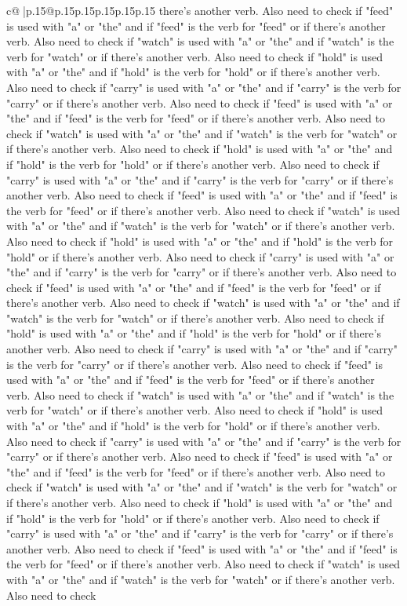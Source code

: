 \documentclass{article}
\begin{document}
{\begin{supertabular}{c@{$\;$}|p{.15\linewidth}@{}p{.15\linewidth}p{.15\linewidth}p{.15\linewidth}p{.15\linewidth}p{.15\linewidth}}
{{{there's another verb. Also need to check if "feed" is used with "a" or "the" and if "feed" is the verb for "feed" or if there's another verb. Also need to check if "watch" is used with "a" or "the" and if "watch" is the verb for "watch" or if there's another verb. Also need to check if "hold" is used with "a" or "the" and if "hold" is the verb for "hold" or if there's another verb. Also need to check if "carry" is used with "a" or "the" and if "carry" is the verb for "carry" or if there's another verb. Also need to check if "feed" is used with "a" or "the" and if "feed" is the verb for "feed" or if there's another verb. Also need to check if "watch" is used with "a" or "the" and if "watch" is the verb for "watch" or if there's another verb. Also need to check if "hold" is used with "a" or "the" and if "hold" is the verb for "hold" or if there's another verb. Also need to check if "carry" is used with "a" or "the" and if "carry" is the verb for "carry" or if there's another verb. Also need to check if "feed" is used with "a" or "the" and if "feed" is the verb for "feed" or if there's another verb. Also need to check if "watch" is used with "a" or "the" and if "watch" is the verb for "watch" or if there's another verb. Also need to check if "hold" is used with "a" or "the" and if "hold" is the verb for "hold" or if there's another verb. Also need to check if "carry" is used with "a" or "the" and if "carry" is the verb for "carry" or if there's another verb. Also need to check if "feed" is used with "a" or "the" and if "feed" is the verb for "feed" or if there's another verb. Also need to check if "watch" is used with "a" or "the" and if "watch" is the verb for "watch" or if there's another verb. Also need to check if "hold" is used with "a" or "the" and if "hold" is the verb for "hold" or if there's another verb. Also need to check if "carry" is used with "a" or "the" and if "carry" is the verb for "carry" or if there's another verb. Also need to check if "feed" is used with "a" or "the" and if "feed" is the verb for "feed" or if there's another verb. Also need to check if "watch" is used with "a" or "the" and if "watch" is the verb for "watch" or if there's another verb. Also need to check if "hold" is used with "a" or "the" and if "hold" is the verb for "hold" or if there's another verb. Also need to check if "carry" is used with "a" or "the" and if "carry" is the verb for "carry" or if there's another verb. Also need to check if "feed" is used with "a" or "the" and if "feed" is the verb for "feed" or if there's another verb. Also need to check if "watch" is used with "a" or "the" and if "watch" is the verb for "watch" or if there's another verb. Also need to check if "hold" is used with "a" or "the" and if "hold" is the verb for "hold" or if there's another verb. Also need to check if "carry" is used with "a" or "the" and if "carry" is the verb for "carry" or if there's another verb. Also need to check if "feed" is used with "a" or "the" and if "feed" is the verb for "feed" or if there's another verb. Also need to check if "watch" is used with "a" or "the" and if "watch" is the verb for "watch" or if there's another verb. Also need to check }}}
\end{supertabular}}
\end{document}
